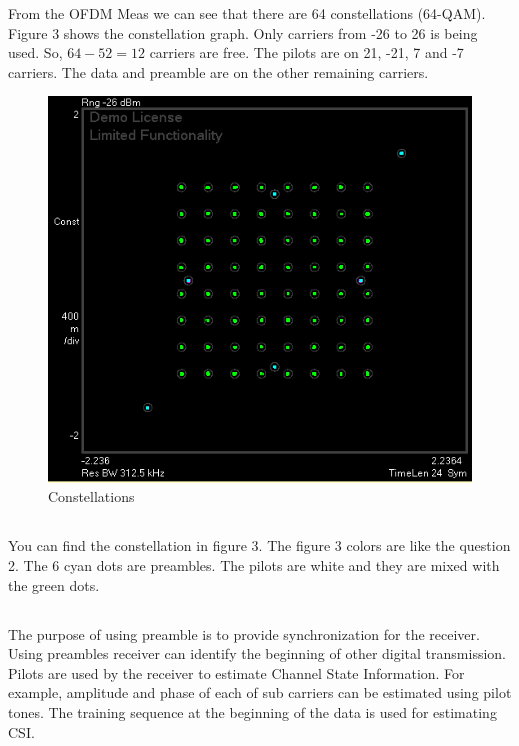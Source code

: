 \documentclass{article}
\begin{document}
From the OFDM Meas we can see that there are 64 constellations (64-QAM). Figure 3 shows the constellation graph. Only carriers from -26 to 26 is being used. So, $64-52=12$ carriers are free. The pilots are on 21, -21, 7 and -7 carriers. The data and preamble are on the other remaining carriers.

\begin{figure}[htb!]
    \centering
    \includegraphics[scale=0.5]{ofdm-meas}
    \caption{Constellations}
\end{figure}

\subsection{}
You can find the constellation in figure 3. The figure 3 colors are like the question 2. The 6 cyan dots are preambles. The pilots are white and they are mixed with the green dots. 

\subsection{}
The purpose of using preamble is to provide synchronization for the receiver. Using preambles receiver can identify the beginning of other digital transmission. Pilots are used by the receiver to estimate Channel State Information. For example, amplitude and phase of each of sub carriers can be estimated using pilot tones. The training sequence at the beginning of the data is used for estimating CSI.
\end{document}
